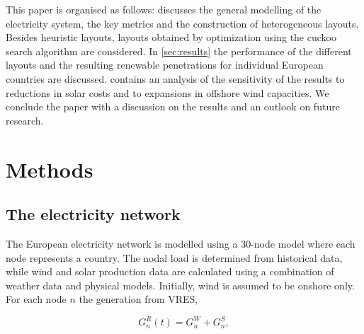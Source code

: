 \documentclass[a4paper, 12pt, sort&compress]{elsarticle}%
\begin{document}

This paper is organised as follows:  discusses the
general modelling of the electricity system, the key metrics and the
construction of heterogeneous layouts. Besides heuristic layouts,
layouts obtained by optimization using the cuckoo search algorithm are
considered. In \cref{sec:results} the performance of the different
layouts and the resulting renewable penetrations for individual
European countries are discussed. 
contains an analysis of the sensitivity of the results to reductions
in solar costs and to expansions in offshore wind capacities. We
conclude the paper with a discussion on the results and an outlook on
future research.

\section{Methods}
\label{sec:two}
\subsection{The electricity network}

The European electricity network is modelled using a 30-node model
where each node represents a country. The nodal load is determined
from historical data, while wind and solar production data are
calculated using a combination of weather data and physical
models\cite{REA}. Initially, wind is assumed to be onshore only. For
each node $n$ the generation from VRES,

\begin{equation}
  G^{R}_{n}(t) = G_{n}^{W} + G_{n}^{S},
\end{equation} 
\end{document}
